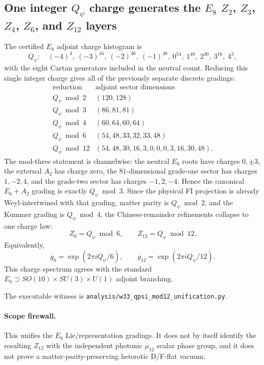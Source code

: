 \subsection*{One integer $Q_\psi$ charge generates the $E_8$ $Z_2$, $Z_3$, $Z_4$, $Z_6$, and $Z_{12}$ layers}

The certified $E_8$ adjoint charge histogram is
\[
Q_\psi:\quad
(-4)^3,\ (-3)^{16},\ (-2)^{30},\ (-1)^{48},\
0^{54},\ 1^{48},\ 2^{30},\ 3^{16},\ 4^3,
\]
with the eight Cartan generators included in the neutral count.  Reducing this
single integer charge gives all of the previously separate discrete gradings:
\[
\begin{array}{c|c}
\text{reduction}&\text{adjoint sector dimensions}\\ \hline
Q_\psi\bmod2&(120,128)\\
Q_\psi\bmod3&(86,81,81)\\
Q_\psi\bmod4&(60,64,60,64)\\
Q_\psi\bmod6&(54,48,33,32,33,48)\\
Q_\psi\bmod12&(54,48,30,16,3,0,0,0,3,16,30,48).
\end{array}
\]
The mod-three statement is channelwise: the neutral $E_6$ roots have charges
$0,\pm3$, the external $A_2$ has charge zero, the $81$-dimensional grade-one
sector has charges $1,-2,4$, and the grade-two sector has charges $-1,2,-4$.
Hence the canonical $E_6+A_2$ grading is exactly $Q_\psi\bmod3$.  Since the
physical FI projection is already Weyl-intertwined with that grading, matter
parity is $Q_\psi\bmod2$, and the Kummer grading is $Q_\psi\bmod4$, the
Chinese-remainder refinements collapse to one charge law:
\[
\boxed{Z_6=Q_\psi\bmod6,\qquad Z_{12}=Q_\psi\bmod12.}
\]
Equivalently,
\[
g_6=\exp(2\pi i Q_\psi/6),\qquad
g_{12}=\exp(2\pi i Q_\psi/12).
\]
This charge spectrum agrees with the standard
$E_8\supset SO(10)\times SU(3)\times U(1)$ adjoint branching.

The executable witness is
\texttt{analysis/w33\_qpsi\_mod12\_unification.py}.

\paragraph{Scope firewall.}
This unifies the $E_8$ Lie/representation gradings.  It does not by itself
identify the resulting $Z_{12}$ with the independent photonic $\mu_{12}$
scalar phase group, and it does not prove a matter-parity-preserving
heterotic D/F-flat vacuum.
